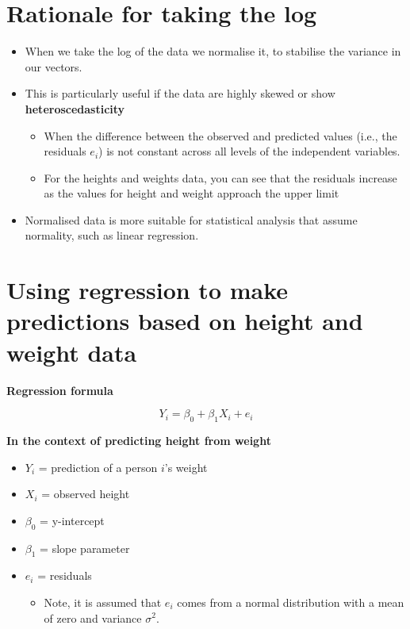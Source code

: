 \documentclass[
]{article}
\providecommand{\tightlist}{%
  \setlength{\itemsep}{0pt}\setlength{\parskip}{0pt}}
\begin{document}
\hypertarget{rationale-for-taking-the-log}{%
\section{Rationale for taking the
log}\label{rationale-for-taking-the-log}}

\begin{itemize}
\tightlist
\item
  When we take the log of the data we normalise it, to stabilise the
  variance in our vectors.
\item
  This is particularly useful if the data are highly skewed or show
  \textbf{heteroscedasticity}

  \begin{itemize}
  \tightlist
  \item
    When the difference between the observed and predicted values (i.e.,
    the residuals \(e_i\)) is not constant across all levels of the
    independent variables.
  \item
    For the heights and weights data, you can see that the residuals
    increase as the values for height and weight approach the upper
    limit
  \end{itemize}
\item
  Normalised data is more suitable for statistical analysis that assume
  normality, such as linear regression.
\end{itemize}

\hypertarget{using-regression-to-make-predictions-based-on-height-and-weight-data}{%
\section{Using regression to make predictions based on height and weight
data}\label{using-regression-to-make-predictions-based-on-height-and-weight-data}}

\textbf{Regression formula}

\[Y_i = \beta_0 + \beta_1 X_i + e_i\]

\textbf{In the context of predicting height from weight}

\begin{itemize}
\item
  \(Y_i\) = prediction of a person \(i\)'s weight
\item
  \(X_i\) = observed height
\item
  \(\beta_0\) = y-intercept
\item
  \(\beta_1\) = slope parameter
\item
  \(e_i\) = residuals

  \begin{itemize}
  \tightlist
  \item
    Note, it is assumed that \(e_i\) comes from a normal distribution
    with a mean of zero and variance \(\sigma^2\).
  \end{itemize}
\end{itemize}
\end{document}
